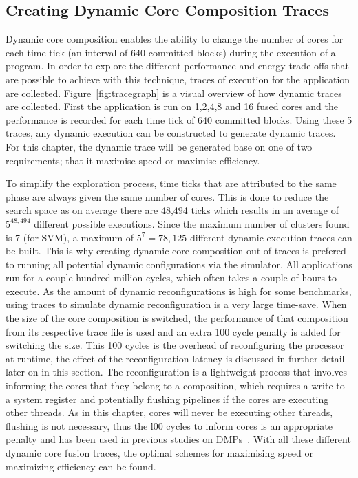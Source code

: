 \subsection{Creating Dynamic Core Composition Traces}

Dynamic core composition enables the ability to change the number of cores for each time tick (an interval of 640 committed blocks) during the execution of a program.
In order to explore the different performance and energy trade-offs that are possible to achieve with this technique, traces of execution for the application are collected.
Figure~\ref{fig:tracegraph} is a visual overview of how dynamic traces are collected.
First the application is run on 1,2,4,8 and 16 fused cores and the performance is recorded for each time tick of 640 committed blocks.
Using these 5 traces, any dynamic execution can be constructed to generate dynamic traces.
For this chapter, the dynamic trace will be generated base on one of two requirements; that it maximise speed or maximise efficiency.

To simplify the exploration process, time ticks that are attributed to the same phase are always given the same number of cores.
This is done to reduce the search space as on average there are 48,494 ticks which results in an average of $5^{48,494}$ different possible executions.
Since the maximum number of clusters found is 7 (for SVM), a maximum of $5^{7} = 78,125$ different dynamic execution traces can be built.
This is why creating dynamic core-composition out of traces is prefered to running all potential dynamic configurations via the simulator.
All applications run for a couple hundred million cycles, which often takes a couple of hours to execute.
As the amount of dynamic reconfigurations is high for some benchmarks, using traces to simulate dynamic reconfiguration is a very large time-save.
When the size of the core composition is switched, the performance of that composition from its respective trace file is used and an extra 100 cycle penalty is added for switching the size.
This 100 cycles is the overhead of reconfiguring the processor at runtime, the effect of the reconfiguration latency is discussed in further detail later on in this section.
The reconfiguration is a lightweight process that involves informing the cores that they belong to a composition, which requires a write to a system register and potentially flushing pipelines if the cores are executing other threads.
As in this chapter, cores will never be executing other threads, flushing is not necessary, thus the l00 cycles to inform cores is an appropriate penalty and has been used in previous studies on DMPs~\cite{pricopi2012bahurupi}.
With all these different dynamic core fusion traces, the optimal schemes for maximising speed or maximizing efficiency can be found.

